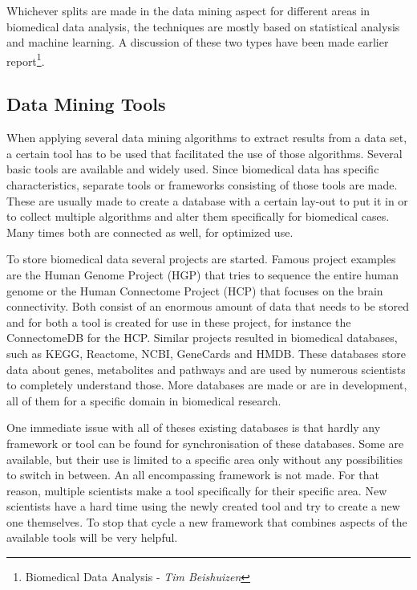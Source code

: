 \documentclass[10pt,a4paper]{article}
\begin{document}
	Whichever splits are made in the data mining aspect for different areas in biomedical data analysis, the techniques are mostly based on statistical analysis and machine learning. A discussion of these two types have been made earlier report\footnote{\label{fn:BDA}Biomedical Data Analysis - \textit{Tim Beishuizen}}.
	
	\subsection{Data Mining Tools}
	\label{subsec:DataMiningTools}
	
	When applying several data mining algorithms to extract results from a data set, a certain tool has to be used that facilitated the use of those algorithms. Several basic tools are available and widely used. Since biomedical data has specific characteristics, separate tools or frameworks consisting of those tools are made. These are usually made to create a database with a certain lay-out to put it in or to collect multiple algorithms and alter them specifically for biomedical cases. Many times both are connected as well, for optimized use.
	
	To store biomedical data several projects are started. Famous project examples are the Human Genome Project (HGP) that tries to sequence the entire human genome\cite{sawicki1993human} or the Human Connectome Project (HCP) that focuses on the brain connectivity\cite{van2012human}. Both consist of an enormous amount of data that needs to be stored and for both a tool is created for use in these project, for instance the ConnectomeDB for the HCP\cite{marcus2011informatics}. Similar projects resulted in biomedical databases, such as KEGG\cite{kanehisa2000kegg}, Reactome\cite{joshi2005reactome}, NCBI\cite{edgar2002gene}, GeneCards\cite{safran2010genecards} and HMDB\cite{wishart2007hmdb}. These databases store data about genes, metabolites and pathways and are used by numerous scientists to completely understand those. More databases are made or are in development, all of them for a specific domain in biomedical research.
	
	One immediate issue with all of theses existing databases is that hardly any framework or tool can be found for synchronisation of these databases. Some are available\cite{mork2001model, sujansky2001heterogeneous}, but their use is limited to a specific area only without any possibilities to switch in between. An all encompassing framework is not made. For that reason, multiple scientists make a tool specifically for their specific area. New scientists have a hard time using the newly created tool and try to create a new one themselves. To stop that cycle a new framework that combines aspects of the available tools will be very helpful\cite{teodoro2009biomedical}.
	
\end{document}
